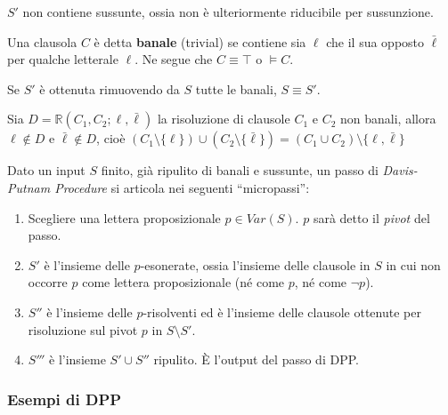\begin{oss}
$S'$ non contiene sussunte, ossia non è ulteriormente riducibile per sussunzione.
\end{oss}

\begin{defi}
Una clausola $C$ è detta \textbf{banale} (trivial) se contiene sia $\ell$ che il sua opposto $\bar{\ell}$ per qualche letterale $\ell$. Ne segue che $C \equiv \top$ o $\models C$. 
\end{defi}

\begin{defi}
Se $S'$ è ottenuta rimuovendo da $S$ tutte le banali, $S \equiv S'$.
\end{defi}

\begin{oss}
Sia $D = \mathbb{R}(C_1, C_2; \ell, \bar{\ell})$ la risoluzione di clausole $C_1$ e $C_2$ non banali, allora $\ell \notin D$ e $\bar{\ell} \notin D$, cioè $(C_1 \setminus \{\ell\}) \cup (C_2 \setminus \{ \bar{\ell}\}) = (C_1 \cup C_2) \setminus \{\ell, \bar{\ell}\}$
\end{oss}

\begin{defi}
Dato un  input $S$ finito, già ripulito di banali e sussunte, un passo di \textit{Davis-Putnam Procedure} si articola nei seguenti ``micropassi'': 
\begin{enumerate}
  \item Scegliere una lettera proposizionale $p \in Var(S)$. $p$ sarà detto il \textit{pivot} del passo.
  \item $S'$ è l'insieme delle $p$-esonerate, ossia l'insieme delle clausole in $S$ in cui non occorre $p$ come lettera proposizionale (né come $p$, né come $\neg p$).
  \item $S''$ è l'insieme delle $p$-risolventi ed è l'insieme delle clausole ottenute per risoluzione sul pivot $p$ in $S\setminus S'$. 
  \item $S'''$ è l'insieme  $S' \cup S''$ ripulito. È l'output del passo di DPP.
\end{enumerate}
\end{defi}

\subsubsection{Esempi di DPP}

